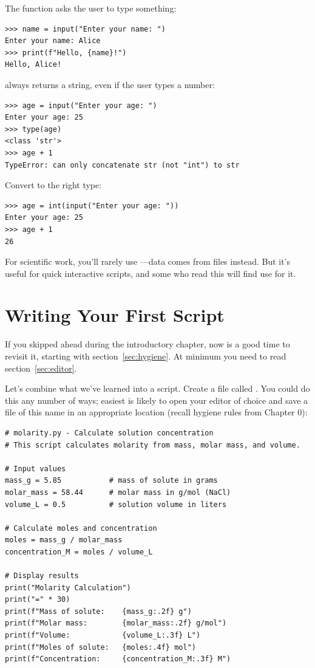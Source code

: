 The  function asks the user to type something:

\begin{lstlisting}
>>> name = input("Enter your name: ")
Enter your name: Alice
>>> print(f"Hello, {name}!")
Hello, Alice!
\end{lstlisting}

\begin{warning}
 always returns a string, even if the user types a number:
\begin{lstlisting}
>>> age = input("Enter your age: ")
Enter your age: 25
>>> type(age)
<class 'str'>
>>> age + 1
TypeError: can only concatenate str (not "int") to str
\end{lstlisting}
Convert to the right type:
\begin{lstlisting}
>>> age = int(input("Enter your age: "))
Enter your age: 25
>>> age + 1
26
\end{lstlisting}
\end{warning}

For scientific work, you'll rarely use ---data comes from files instead. But it's useful for quick interactive scripts, and some who read this will find use for it. 

\section{Writing Your First Script}
\label{sec:first-script}

\begin{warning}
If you skipped ahead during the introductory chapter, now is a good time to revisit it, starting with section~\ref{sec:hygiene}. At minimum you need to read section~\ref{sec:editor}.
\end{warning}

Let's combine what we've learned into a script. Create a file called . You could do this any number of ways; easiest is likely to open your editor of choice and save a file of this name in an appropriate location (recall hygiene rules from Chapter 0):

\begin{lstlisting}
# molarity.py - Calculate solution concentration
# This script calculates molarity from mass, molar mass, and volume.

# Input values
mass_g = 5.85           # mass of solute in grams
molar_mass = 58.44      # molar mass in g/mol (NaCl)
volume_L = 0.5          # solution volume in liters

# Calculate moles and concentration
moles = mass_g / molar_mass
concentration_M = moles / volume_L

# Display results
print("Molarity Calculation")
print("=" * 30)
print(f"Mass of solute:    {mass_g:.2f} g")
print(f"Molar mass:        {molar_mass:.2f} g/mol")
print(f"Volume:            {volume_L:.3f} L")
print(f"Moles of solute:   {moles:.4f} mol")
print(f"Concentration:     {concentration_M:.3f} M")
\end{lstlisting}

